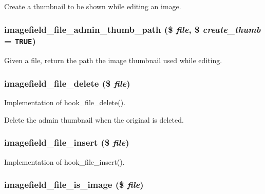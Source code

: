 Create a thumbnail to be shown while editing an image. \hypertarget{imagefield__file_8inc_bb6c32fd6df8c3186e903a79d09b5edc}{
\subsubsection[{imagefield\_\-file\_\-admin\_\-thumb\_\-path}]{\setlength{\rightskip}{0pt plus 5cm}imagefield\_\-file\_\-admin\_\-thumb\_\-path (\$ {\em file}, \/  \$ {\em create\_\-thumb} = {\tt TRUE})}}
\label{imagefield__file_8inc_bb6c32fd6df8c3186e903a79d09b5edc}


Given a file, return the path the image thumbnail used while editing. \hypertarget{imagefield__file_8inc_801b98dd8606a0deba530ce0a0f3cb12}{
\subsubsection[{imagefield\_\-file\_\-delete}]{\setlength{\rightskip}{0pt plus 5cm}imagefield\_\-file\_\-delete (\$ {\em file})}}
\label{imagefield__file_8inc_801b98dd8606a0deba530ce0a0f3cb12}


Implementation of hook\_\-file\_\-delete().

Delete the admin thumbnail when the original is deleted. \hypertarget{imagefield__file_8inc_9719de2adc80696507733e3390c10da4}{
\subsubsection[{imagefield\_\-file\_\-insert}]{\setlength{\rightskip}{0pt plus 5cm}imagefield\_\-file\_\-insert (\$ {\em file})}}
\label{imagefield__file_8inc_9719de2adc80696507733e3390c10da4}


Implementation of hook\_\-file\_\-insert(). \hypertarget{imagefield__file_8inc_4dc1eaffb4ea5cb05a516f47d858e84d}{
\subsubsection[{imagefield\_\-file\_\-is\_\-image}]{\setlength{\rightskip}{0pt plus 5cm}imagefield\_\-file\_\-is\_\-image (\$ {\em file})}}
\label{imagefield__file_8inc_4dc1eaffb4ea5cb05a516f47d858e84d}


